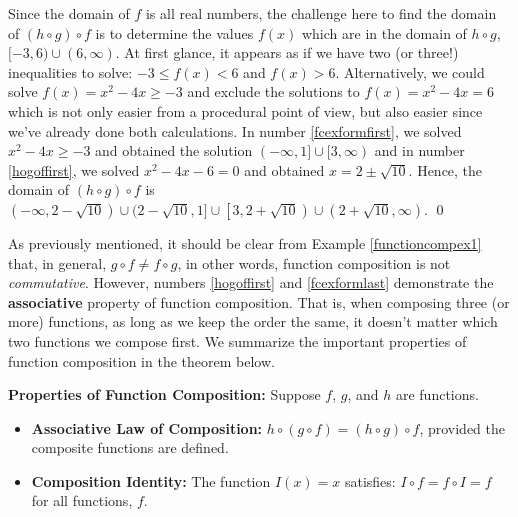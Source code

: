 \begin{ex}
\begin{enumerate}
\begin{itemize}
 \end{itemize}

 
Since the domain of $f$ is all real numbers, the challenge here to find the domain of $(h \circ g) \circ f$ is to determine the values $f(x)$ which are in the domain of  $h \circ g$,  $[-3, 6) \cup (6, \infty)$.  At first glance, it appears as if we have two (or three!) inequalities to solve:  $-3 \leq f(x) < 6$ and $f(x) > 6$.  Alternatively, we could solve $f(x) = x^2-4x \geq -3$ and exclude the solutions to $f(x) = x^2-4x = 6$ which is not only easier from a procedural point of view, but also easier since we've already done both calculations.   In number \ref{fcexformfirst}, we solved  $x^2-4x \geq -3$ and obtained the solution $(-\infty, 1] \cup [3, \infty)$ and in number \ref{hogoffirst}, we solved $x^2-4x-6 = 0$ and obtained $x = 2 \pm \sqrt{10}$.  Hence, the domain of $(h \circ g) \circ f$ is  $(-\infty, 2 -\sqrt{10}) \cup (2 - \sqrt{10}, 1] \cup \left[3, 2 + \sqrt{10}\right) \cup \left(2+\sqrt{10}, \infty\right)$. \qed

\end{enumerate}

\label{functioncompex1}
\end{ex}

As previously mentioned, it should be clear from  Example \ref{functioncompex1} that, in general, $g \circ f \neq f \circ g$, in other words, function composition is not \textit{commutative}.  However, numbers \ref{hogoffirst} and  \ref{fcexformlast} demonstrate the  \textbf{associative} property of function composition.  That is, when composing three (or more) functions, as long as we keep the order the same, it doesn't matter which two functions we compose first.  We summarize the important properties of function composition in the theorem below.

\medskip

\colorbox{ResultColor}{\bbm
\begin{thm}\label{functioncompprops}  \textbf{Properties of Function Composition:} Suppose $f$, $g$, and $h$ are functions.  

\begin{itemize}

\item  \textbf{Associative Law of Composition:} $h \circ (g \circ f) = (h \circ g) \circ f$, provided the composite functions are defined.

\item  \textbf{Composition Identity:}  The function $I(x) = x$ satisfies:  $ I \circ f = f \circ I =f$ for all functions, $f$.

\end{itemize}

\end{thm}
\ebm}


